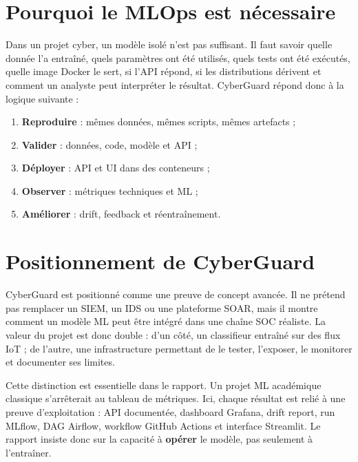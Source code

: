 \section{Pourquoi le MLOps est nécessaire}
Dans un projet cyber, un modèle isolé n'est pas suffisant. Il faut savoir quelle donnée l'a entraîné, quels paramètres ont été utilisés, quels tests ont été exécutés, quelle image Docker le sert, si l'API répond, si les distributions dérivent et comment un analyste peut interpréter le résultat. CyberGuard répond donc à la logique suivante :
\begin{enumerate}
  \item \textbf{Reproduire} : mêmes données, mêmes scripts, mêmes artefacts ;
  \item \textbf{Valider} : données, code, modèle et API ;
  \item \textbf{Déployer} : API et UI dans des conteneurs ;
  \item \textbf{Observer} : métriques techniques et ML ;
  \item \textbf{Améliorer} : drift, feedback et réentraînement.
\end{enumerate}

\section{Positionnement de CyberGuard}
CyberGuard est positionné comme une preuve de concept avancée. Il ne prétend pas remplacer un SIEM, un IDS ou une plateforme SOAR, mais il montre comment un modèle ML peut être intégré dans une chaîne SOC réaliste. La valeur du projet est donc double : d'un côté, un classifieur entraîné sur des flux IoT ; de l'autre, une infrastructure permettant de le tester, l'exposer, le monitorer et documenter ses limites.

Cette distinction est essentielle dans le rapport. Un projet ML académique classique s'arrêterait au tableau de métriques. Ici, chaque résultat est relié à une preuve d'exploitation : API documentée, dashboard Grafana, drift report, run MLflow, DAG Airflow, workflow GitHub Actions et interface Streamlit. Le rapport insiste donc sur la capacité à \textbf{opérer} le modèle, pas seulement à l'entraîner.
